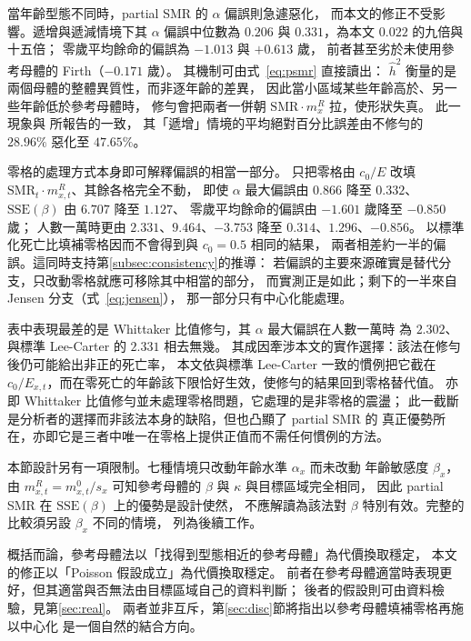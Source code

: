 \documentclass[UTF8, fontset=macnew, a4paper, 12pt]{ctexart}
\begin{document}
當年齡型態不同時，partial SMR 的 $\alpha$ 偏誤則急遽惡化，
而本文的修正不受影響。遞增與遞減情境下其 $\alpha$ 偏誤中位數為
$0.206$ 與 $0.331$，為本文 $0.022$ 的九倍與十五倍；
零歲平均餘命的偏誤為 $-1.013$ 與 $+0.613$ 歲，
前者甚至劣於未使用參考母體的 Firth（$-0.171$ 歲）。
其機制可由式~\eqref{eq:psmr} 直接讀出：
$\hat h^2$ 衡量的是兩個母體的整體異質性，而非逐年齡的差異，
因此當小區域某些年齡高於、另一些年齡低於參考母體時，
修勻會把兩者一併朝 $\mathrm{SMR}\cdot m^{R}_x$ 拉，使形狀失真。
此一現象與 \citet[Table 1]{yue2019}所報告的一致，
其「遞增」情境的平均絕對百分比誤差由不修勻的 $28.96\%$ 惡化至 $47.65\%$。

零格的處理方式本身即可解釋偏誤的相當一部分。
只把零格由 $c_0/E$ 改填 $\mathrm{SMR}_t\cdot m^{R}_{x,t}$、其餘各格完全不動，
即使 $\alpha$ 最大偏誤由 $0.866$ 降至 $0.332$、
$\mathrm{SSE}(\beta)$ 由 $6.707$ 降至 $1.127$、
零歲平均餘命的偏誤由 $-1.601$ 歲降至 $-0.850$ 歲；
人數一萬時更由 $2.331$、$9.464$、$-3.753$ 降至 $0.314$、$1.296$、$-0.856$。
以標準化死亡比填補零格因而不會得到與 $c_0=0.5$ 相同的結果，
兩者相差約一半的偏誤。這同時支持第\ref{subsec:consistency}的推導：
若偏誤的主要來源確實是替代分支，只改動零格就應可移除其中相當的部分，
而實測正是如此；剩下的一半來自 Jensen 分支（式~\eqref{eq:jensen}），
那一部分只有中心化能處理。

表中表現最差的是 Whittaker 比值修勻，其 $\alpha$ 最大偏誤在人數一萬時
為 $2.302$、與標準 Lee-Carter 的 $2.331$ 相去無幾。
其成因牽涉本文的實作選擇：該法在修勻後仍可能給出非正的死亡率，
本文依與標準 Lee-Carter 一致的慣例把它截在
$c_0/E_{x,t}$，而在零死亡的年齡該下限恰好生效，使修勻的結果回到零格替代值。
亦即 Whittaker 比值修勻並未處理零格問題，它處理的是非零格的震盪；
此一截斷是分析者的選擇而非該法本身的缺陷，但也凸顯了 partial SMR 的
真正優勢所在，亦即它是三者中唯一在零格上提供正值而不需任何慣例的方法。

本節設計另有一項限制。七種情境只改動年齡水準 $\alpha_x$ 而未改動
年齡敏感度 $\beta_x$，由 $m^{R}_{x,t}=m^{0}_{x,t}/s_x$ 可知參考母體的
$\beta$ 與 $\kappa$ 與目標區域完全相同，
因此 partial SMR 在 $\mathrm{SSE}(\beta)$ 上的優勢是設計使然，
不應解讀為該法對 $\beta$ 特別有效。完整的比較須另設 $\beta_x$ 不同的情境，
列為後續工作。

概括而論，參考母體法以「找得到型態相近的參考母體」為代價換取穩定，
本文的修正以「Poisson 假設成立」為代價換取穩定。
前者在參考母體適當時表現更好，但其適當與否無法由目標區域自己的資料判斷；
後者的假設則可由資料檢驗，見第\ref{sec:real}。
兩者並非互斥，第\ref{sec:disc}節將指出以參考母體填補零格再施以中心化
是一個自然的結合方向。
\end{document}
